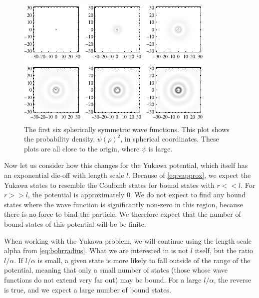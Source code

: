 \documentclass[12pt,twoside]{reedthesis}
\begin{document}
\begin{figure}[h]
\centering
\includegraphics{Figures/densityplots}
\caption[Density plots of the first six spherically symmetric Coulomb wave functions]{The first six spherically symmetric wave functions. This plot shows the probability density, $\psi(\rho)^2$, in spherical coordinates. These plots are all close to the origin, where $\psi$ is large.}
\label{fig:boundstates}
\end{figure}

Now let us consider how this changes for the Yukawa potential, which itself has an exponential die-off with length scale $l$. Because of \eqref{eq:vapprox}, we expect the Yukawa states to resemble the Coulomb states for bound states with $r << l$. For $r >> l$, the potential is approximately $0$. We do not expect to find any bound states where the wave function is significantly non-zero in this region, because there is no force to bind the particle. We therefore expect that the number of bound states of this potential will be be finite.

When working with the Yukawa problem, we will continue using the length scale alpha from \eqref{eq:bohrradius}. What we are interested in is not $l$ itself, but the ratio $l / \alpha$.
If $l / \alpha$ is small, a given state is more likely to fall outside of the range of the potential, meaning that only a small number of states (those whose wave functions do not extend very far out) may be bound. For a large $l / \alpha$, the reverse is true, and we expect a large number of bound states.

\clearpage %
\end{document}
